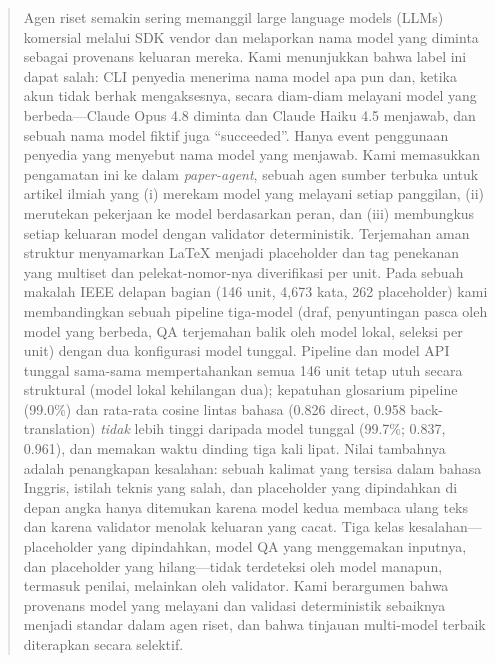 \begin{abstract}
Agen riset semakin sering memanggil large language models (LLMs) komersial melalui SDK vendor dan melaporkan nama model yang diminta sebagai provenans keluaran mereka. Kami menunjukkan bahwa label ini dapat salah: CLI penyedia menerima nama model apa pun dan, ketika akun tidak berhak mengaksesnya, secara diam-diam melayani model yang berbeda---Claude Opus 4.8 diminta dan Claude Haiku 4.5 menjawab, dan sebuah nama model fiktif juga ``succeeded''. Hanya event penggunaan penyedia yang menyebut nama model yang menjawab. Kami memasukkan pengamatan ini ke dalam \emph{paper-agent}, sebuah agen sumber terbuka untuk artikel ilmiah yang (i) merekam model yang melayani setiap panggilan, (ii) merutekan pekerjaan ke model berdasarkan peran, dan (iii) membungkus setiap keluaran model dengan validator deterministik. Terjemahan aman struktur menyamarkan LaTeX menjadi placeholder dan tag penekanan yang multiset dan pelekat-nomor-nya diverifikasi per unit. Pada sebuah makalah IEEE delapan bagian (146 unit, 4{,}673 kata, 262 placeholder) kami membandingkan sebuah pipeline tiga-model (draf, penyuntingan pasca oleh model yang berbeda, QA terjemahan balik oleh model lokal, seleksi per unit) dengan dua konfigurasi model tunggal. Pipeline dan model API tunggal sama-sama mempertahankan semua 146 unit tetap utuh secara struktural (model lokal kehilangan dua); kepatuhan glosarium pipeline (99.0\%) dan rata-rata cosine lintas bahasa (0.826 direct, 0.958 back-translation) \emph{tidak} lebih tinggi daripada model tunggal (99.7\%; 0.837, 0.961), dan memakan waktu dinding tiga kali lipat. Nilai tambahnya adalah penangkapan kesalahan: sebuah kalimat yang tersisa dalam bahasa Inggris, istilah teknis yang salah, dan placeholder yang dipindahkan di depan angka hanya ditemukan karena model kedua membaca ulang teks dan karena validator menolak keluaran yang cacat. Tiga kelas kesalahan---placeholder yang dipindahkan, model QA yang menggemakan inputnya, dan placeholder yang hilang---tidak terdeteksi oleh model manapun, termasuk penilai, melainkan oleh validator. Kami berargumen bahwa provenans model yang melayani dan validasi deterministik sebaiknya menjadi standar dalam agen riset, dan bahwa tinjauan multi-model terbaik diterapkan secara selektif.
\end{abstract}
